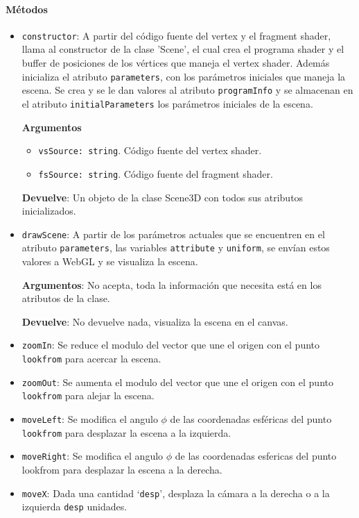 \paragraph{Métodos}
\begin{itemize}
    \item \verb|constructor|: A partir del código fuente del vertex y el fragment shader, llama al constructor de la clase 'Scene', el cual crea el programa shader y el buffer de posiciones de los vértices que maneja el vertex shader. Además inicializa el atributo \verb|parameters|, con los parámetros iniciales que maneja la escena. Se crea y se le dan valores al atributo \verb|programInfo| y se almacenan en el atributo \verb|initialParameters| los parámetros iniciales de la escena.
    
    \textbf{Argumentos}
    \begin{itemize}
        \item \verb|vsSource: string|. Código fuente del vertex shader.
        \item \verb|fsSource: string|. Código fuente del fragment shader.
    \end{itemize}
    \textbf{Devuelve}: Un objeto de la clase Scene3D con todos sus atributos inicializados.

    \item \verb|drawScene|: A partir de los parámetros actuales que se encuentren en el atributo \verb|parameters|, las variables \verb|attribute| y \verb|uniform|, se envían estos valores a WebGL y se visualiza la escena.
    
    \textbf{Argumentos}: No acepta, toda la información que necesita está en los atributos de la clase.
    
    \textbf{Devuelve}: No devuelve nada, visualiza la escena en el canvas.

    \item \verb|zoomIn|: Se reduce el modulo del vector que une el origen con el punto \verb|lookfrom| para acercar la escena.
    \item \verb|zoomOut|: Se aumenta el modulo del vector que une el origen con el punto \verb|lookfrom| para alejar la escena.
    \item \verb|moveLeft|: Se modifica el angulo $\phi$ de las coordenadas esféricas del punto \verb|lookfrom| para desplazar la escena a la izquierda.
    \item \verb|moveRight|: Se modifica el angulo $\phi$ de las coordenadas esfericas del punto lookfrom para desplazar la escena a la derecha.
    \item \verb|moveX|: Dada una cantidad `\verb|desp|', desplaza la cámara a la derecha o a la izquierda \verb|desp| unidades.


\end{itemize}
